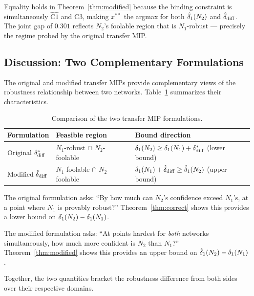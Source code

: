 Equality holds in Theorem~\ref{thm:modified} because the binding constraint is simultaneously $\widehat{\mathrm{C1}}$ and C3, making $x^{**}$ the argmax for both $\hat{\delta}_1(N_{2})$ and $\hat{\delta}_{\mathrm{diff}}$. The joint gap of $0.301$ reflects $N_2$'s foolable region that is $N_1$-robust --- precisely the regime probed by the original transfer MIP.

\subsection{Discussion: Two Complementary Formulations}
\label{sec:formal:discussion}

The original and modified transfer MIPs provide complementary views of the robustness relationship between two networks. Table~\ref{tab:complementary} summarizes their characteristics.

\begin{table}[ht]
\centering
\caption{Comparison of the two transfer MIP formulations.}
\label{tab:complementary}
\renewcommand{\arraystretch}{1.3}
\begin{tabular}{lll}
\toprule
\textbf{Formulation} & \textbf{Feasible region} & \textbf{Bound direction} \\
\midrule
Original $\delta_{\mathrm{diff}}^{*}$ & $N_1$-robust $\cap$ $N_2$-foolable
  & $\delta_1(N_{2})\geq\delta_1(N_{1})+\delta_{\mathrm{diff}}^{*}$ (lower bound) \\
Modified $\hat{\delta}_{\mathrm{diff}}$ & $N_1$-foolable $\cap$ $N_2$-foolable
  & $\delta_1(N_{1})+\hat{\delta}_{\mathrm{diff}}\geq\hat{\delta}_1(N_{2})$ (upper bound) \\
\bottomrule
\end{tabular}
\end{table}

The original formulation asks: ``By how much can $N_2$'s confidence exceed $N_1$'s, at a point where $N_1$ is provably robust?'' Theorem~\ref{thm:correct} shows this provides a lower bound on $\delta_1(N_{2})-\delta_1(N_{1})$.

The modified formulation asks: ``At points hardest for \emph{both} networks simultaneously, how much more confident is $N_2$ than $N_1$?'' Theorem~\ref{thm:modified} shows this provides an upper bound on $\hat{\delta}_1(N_{2})-\delta_1(N_{1})$.

Together, the two quantities bracket the robustness difference from both sides over their respective domains.
